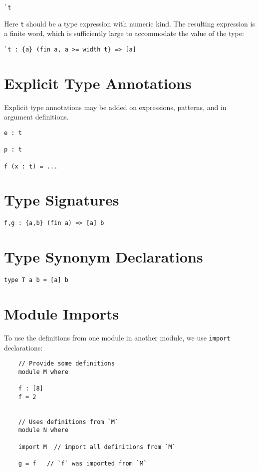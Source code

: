 \begin{verbatim}
`t
\end{verbatim}

Here \texttt{t} should be a type expression with numeric kind. The
resulting expression is a finite word, which is sufficiently large to
accommodate the value of the type:

\begin{verbatim}
`t : {a} (fin a, a >= width t} => [a]
\end{verbatim}

\section{Explicit Type Annotations}\label{explicit-type-annotations}

Explicit type annotations may be added on expressions, patterns, and in
argument definitions.

\begin{verbatim}
e : t

p : t

f (x : t) = ...
\end{verbatim}

\section{Type Signatures}\label{type-signatures}

\begin{verbatim}
f,g : {a,b} (fin a) => [a] b
\end{verbatim}

\section{Type Synonym Declarations}\label{type-synonym-declarations}

\begin{verbatim}
type T a b = [a] b
\end{verbatim}

\section{Module Imports}

To use the definitions from one module in another module, we use
\texttt{import} declarations:


\begin{verbatim}
    // Provide some definitions
    module M where

    f : [8]
    f = 2


    // Uses definitions from `M`
    module N where

    import M  // import all definitions from `M`

    g = f   // `f` was imported from `M`
\end{verbatim}

